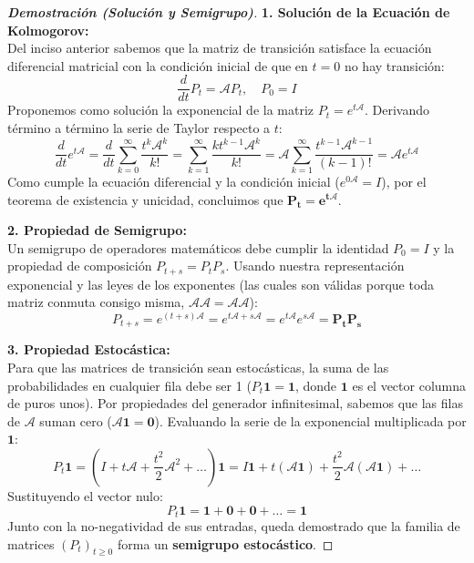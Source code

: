 \documentclass[10pt,a4paper]{article}
\begin{document}
\begin{proof}[\textbf{Demostración (Solución y Semigrupo)}]
    \textbf{1. Solución de la Ecuación de Kolmogorov:} \\
    Del inciso anterior sabemos que la matriz de transición satisface la ecuación diferencial matricial con la condición inicial de que en $t=0$ no hay transición:
    \[ \frac{d}{dt} P_t = \mathcal{A} P_t, \quad P_0 = I \]
    Proponemos como solución la exponencial de la matriz $P_t = e^{t\mathcal{A}}$. Derivando término a término la serie de Taylor respecto a $t$:
    \[ \frac{d}{dt} e^{t\mathcal{A}} = \frac{d}{dt} \sum_{k=0}^\infty \frac{t^k \mathcal{A}^k}{k!} = \sum_{k=1}^\infty \frac{k t^{k-1} \mathcal{A}^k}{k!} = \mathcal{A} \sum_{k=1}^\infty \frac{t^{k-1} \mathcal{A}^{k-1}}{(k-1)!} = \mathcal{A} e^{t\mathcal{A}} \]
    Como cumple la ecuación diferencial y la condición inicial ($e^{0\mathcal{A}} = I$), por el teorema de existencia y unicidad, concluimos que $\mathbf{P_t = e^{t\mathcal{A}}}$.

    \vspace{3mm}
    \textbf{2. Propiedad de Semigrupo:} \\
    Un semigrupo de operadores matemáticos debe cumplir la identidad $P_0 = I$ y la propiedad de composición $P_{t+s} = P_t P_s$. Usando nuestra representación exponencial y las leyes de los exponentes (las cuales son válidas porque toda matriz conmuta consigo misma, $\mathcal{A}\mathcal{A} = \mathcal{A}\mathcal{A}$):
    \[ P_{t+s} = e^{(t+s)\mathcal{A}} = e^{t\mathcal{A} + s\mathcal{A}} = e^{t\mathcal{A}} e^{s\mathcal{A}} = \mathbf{P_t P_s} \]

    \vspace{3mm}
    \textbf{3. Propiedad Estocástica:} \\
    Para que las matrices de transición sean estocásticas, la suma de las probabilidades en cualquier fila debe ser 1 ($P_t \mathbf{1} = \mathbf{1}$, donde $\mathbf{1}$ es el vector columna de puros unos). 
    Por propiedades del generador infinitesimal, sabemos que las filas de $\mathcal{A}$ suman cero ($\mathcal{A} \mathbf{1} = \mathbf{0}$). Evaluando la serie de la exponencial multiplicada por $\mathbf{1}$:
    \[ P_t \mathbf{1} = \left( I + t\mathcal{A} + \frac{t^2}{2}\mathcal{A}^2 + \dots \right) \mathbf{1} = I\mathbf{1} + t(\mathcal{A}\mathbf{1}) + \frac{t^2}{2}\mathcal{A}(\mathcal{A}\mathbf{1}) + \dots \]
    Sustituyendo el vector nulo:
    \[ P_t \mathbf{1} = \mathbf{1} + \mathbf{0} + \mathbf{0} + \dots = \mathbf{1} \]
    Junto con la no-negatividad de sus entradas, queda demostrado que la familia de matrices $(P_t)_{t \ge 0}$ forma un \textbf{semigrupo estocástico}.
\end{proof}
\end{document}
